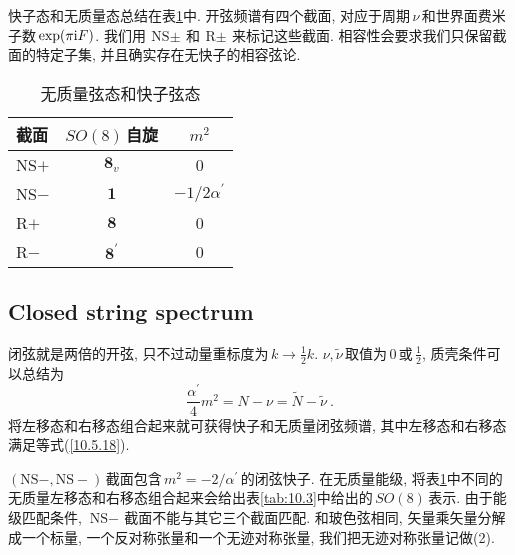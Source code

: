 快子态和无质量态总结在表\ref{tab:10.2}中. 开弦频谱有四个截面, 对应于周期$\,\nu\,$和世界面费米子数$\,\exp(\pi\mathrm{i} F)$. 我们用$\,\text{NS}\pm\,$和$\,\text{R}\pm\,$来标记这些截面. 相容性会要求我们只保留截面的特定子集, 并且确实存在无快子的相容弦论.
\begin{table}[h]
\caption{无质量弦态和快子弦态}
\label{tab:10.2}%
\centering
\begin{tabular}[c]{lcc}
\hline\hline
 \quad\vphantom{\Big(}截面 \quad &\quad $SO(8)\,$自旋 \quad &\quad  $m^{2}$\quad \\
\hline
\quad NS$+$ \quad & $\mathbf{8}_{v} $& 0 \\
\quad NS$-$ \quad & $\mathbf{1} $    & $-1/2\alpha^{\prime}$\\
\quad R$+$ \quad   & $\mathbf{8}   $  & 0\\
\quad R$-$ \quad  & $\mathbf{8}^{\prime}$ & 0 \\
 \hline\hline
\end{tabular}
\end{table}


\subsection*{Closed string spectrum}

闭弦就是两倍的开弦, 只不过动量重标度为$\,k\to\frac{1}{2}k$. $\nu,\tilde{\nu}\,$取值为$\,0\,$或$\,\frac{1}{2}$, 质壳条件可以总结为
\begin{equation}
    \frac{\alpha^{\prime}}{4}m^{2} = N-\nu =\tilde{N} -\tilde{\nu} \:. \label{10.5.18}
\end{equation}
将左移态和右移态组合起来就可获得快子和无质量闭弦频谱, 其中左移态和右移态满足等式(\ref{10.5.18}).

$(\text{NS}-,\text{NS}-)\,$截面包含$\,m^{2}=-2/\alpha^{\prime}\,$的闭弦快子. 在无质量能级, 将表\ref{tab:10.2}中不同的无质量左移态和右移态组合起来会给出表\ref{tab:10.3}中给出的$\,SO(8)\,$表示. 由于能级匹配条件, $\text{NS}-\,$截面不能与其它三个截面匹配. 和玻色弦相同, 矢量乘矢量分解成一个标量, 一个反对称张量和一个无迹对称张量, 我们把无迹对称张量记做(2).

